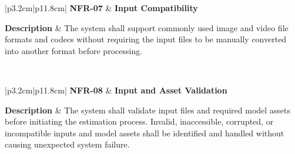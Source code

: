 
\begin{table}[H]
	\centering
	\renewcommand{\arraystretch}{1.25}
	\begin{tabular}{|p{3.2cm}|p{11.8cm}|}
		\hline
		\textbf{NFR-07} &
		\textbf{Input Compatibility} \\ \hline
		
		\textbf{Description} &
		The system shall support commonly used image and video file formats and codecs without requiring the input files to be manually converted into another format before processing. \\ \hline
		
		 \\ \hline
	\end{tabular}
	\caption{Non-functional requirement for input compatibility.}
	\label{tab:nfr07}
\end{table}



\begin{table}[H]
	\centering
	\renewcommand{\arraystretch}{1.25}
	\begin{tabular}{|p{3.2cm}|p{11.8cm}|}
		\hline
		\textbf{NFR-08} &
		\textbf{Input and Asset Validation} \\ \hline
		
		\textbf{Description} &
		The system shall validate input files and required model assets before initiating the estimation process. Invalid, inaccessible, corrupted, or incompatible inputs and model assets shall be identified and handled without causing unexpected system failure. \\ \hline
		
		 \\ \hline
	\end{tabular}
	\caption{Non-functional requirement for input and model asset validation.}
	\label{tab:nfr08}
\end{table}

